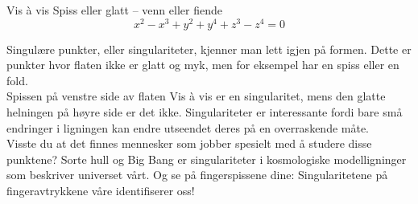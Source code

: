 \begin{surferPage}{Vis à vis}
Spiss eller glatt – venn eller fiende\\
\smallskip
\[x^2	- x^3+ y^2+ y^4+ z^3- z^4	=  0\]

\vspace{0.3cm}
Singulære punkter, eller singulariteter, kjenner man lett igjen på formen. Dette er punkter hvor flaten ikke er glatt og myk, men for eksempel har en spiss eller en fold.\\
\vspace{0.3cm}
Spissen på venstre side av flaten Vis \`a vis er en singularitet, mens den glatte helningen på høyre side er det ikke. Singulariteter er interessante fordi bare små endringer i ligningen kan endre utseendet deres på en overraskende måte.\\

\vspace{0.3cm}
Visste du at det finnes mennesker som jobber spesielt med å studere disse punktene? Sorte hull og Big Bang er singulariteter i kosmologiske modelligninger som beskriver universet vårt. Og se på fingerspissene dine: Singularitetene på fingeravtrykkene våre identifiserer oss!
\end{surferPage}
